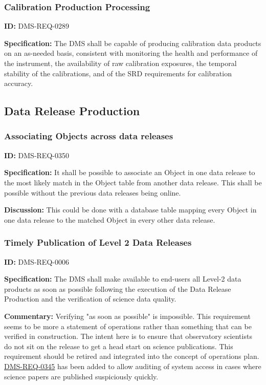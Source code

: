 \documentclass[SE,toc,lsstdraft]{lsstdoc}
\begin{document}
\subsubsection{Calibration Production Processing}

\label{DMS-REQ-0289}
\textbf{ID:} DMS-REQ-0289

\textbf{Specification:} The DMS shall be capable of producing calibration data products on an as-needed basis, consistent with monitoring the health and performance of the instrument, the availability of raw calibration exposures, the temporal stability of the calibrations, and of the SRD requirements for calibration accuracy.






\subsection{Data Release Production}





\subsubsection{Associating Objects across data releases}

\label{DMS-REQ-0350}
\textbf{ID:} DMS-REQ-0350

\textbf{Specification:} It shall be possible to associate an Object in one data release to the most likely match in the Object table from another data release. This shall be possible without the previous data releases being online.

\textbf{Discussion:} This could be done with a database table mapping every Object in one data release to the matched Object in every other data release.




\subsubsection{Timely Publication of Level 2 Data Releases}

\label{DMS-REQ-0006}
\textbf{ID:} DMS-REQ-0006

\textbf{Specification:} The DMS shall make available to end-users all Level-2 data products as soon as possible following the execution of the Data Release Production and the verification of science data quality.

\textbf{Commentary: }Verifying "as soon as possible" is impossible. This requirement seems to be more a statement of operations rather than something that can be verified in construction. The intent here is to ensure that observatory scientists do not sit on the release to get a head start on science publications. This requirement should be retired and integrated into the concept of operations plan. \hyperref[DMS-REQ-0345]{DMS-REQ-0345} has been added to allow auditing of system access in cases where science papers are published suspiciously quickly.
\end{document}
